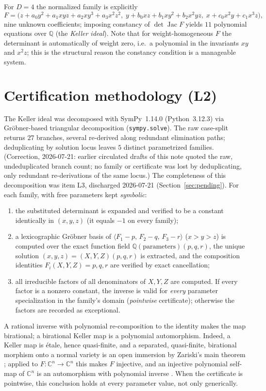 \documentclass[11pt]{article}
\newcommand{\C}{\mathbb{C}}
\begin{document}
For $D=4$ the normalized family is explicitly
\[
F=\bigl(z+a_0y^2+a_1xyz+a_2xy^3+a_3x^2z^2,\;
y+b_0xz+b_1xy^2+b_2x^2yz,\;
x+c_0x^2y+c_1x^3z\bigr),
\]
nine unknown coefficients; imposing
constancy of $\det\operatorname{Jac}F$ yields $11$ polynomial equations over
$\mathbb{Q}$ (the \emph{Keller ideal}). Note that for weight-homogeneous $F$
the determinant is automatically of weight zero, i.e.\ a polynomial in the
invariants $xy$ and $x^{2}z$; this is the structural reason the constancy
condition is a manageable system.

\section{Certification methodology (L2)}\label{sec:method}

The Keller ideal was decomposed with SymPy~1.14.0 (Python~3.12.3) via
Gr\"obner-based triangular decomposition (\texttt{sympy.solve}). The raw
case-split returns $27$ branches, several re-derived along redundant
elimination paths; deduplicating by solution locus leaves $5$ distinct
parametrized families. (Correction, 2026-07-21: earlier circulated drafts of
this note quoted the raw, undeduplicated branch count; no family or
certificate was lost by deduplicating, only redundant re-derivations of the
same locus.) The completeness of this decomposition was item L3, discharged
2026-07-21 (Section~\ref{sec:pending}). For each family, with free parameters
kept \emph{symbolic}:
\begin{enumerate}
\item the substituted determinant is expanded and verified to be a constant
identically in $(x,y,z)$ (it equals $-1$ on every family);
\item a lexicographic Gr\"obner basis of
$\langle F_1-p,\,F_2-q,\,F_3-r\rangle$ ($x>y>z$) is computed over the exact
function field $\mathbb{Q}(\text{parameters})(p,q,r)$, the unique solution
$(x,y,z)=(X,Y,Z)(p,q,r)$ is extracted, and the composition identities
$F_i(X,Y,Z)=p,q,r$ are verified by exact cancellation;
\item all irreducible factors of all denominators of $X,Y,Z$ are computed. If
every factor is a nonzero constant, the inverse is valid for \emph{every}
parameter specialization in the family's domain (\emph{pointwise} certificate);
otherwise the factors are recorded as exceptional.
\end{enumerate}
A rational inverse with polynomial re-composition to the identity makes the map
birational; a birational Keller map is a polynomial automorphism. Indeed, a
Keller map is \'etale, hence quasi-finite, and a separated, quasi-finite,
birational morphism onto a normal variety is an open immersion by Zariski's
main theorem \cite{mumford}; applied to $F\colon\C^{n}\to\C^{n}$ this makes
$F$ injective, and an injective polynomial self-map of $\C^{n}$ is an
automorphism with polynomial inverse \cite{rudin}. When the certificate is
pointwise, this conclusion holds at every parameter value, not only generically.
\end{document}
